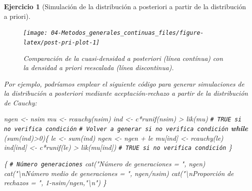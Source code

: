 \documentclass[
]{book}
\newenvironment{Shaded}{\begin{snugshade}}{\end{snugshade}}
\newcommand{\CommentTok}[1]{\textcolor[rgb]{0.56,0.35,0.01}{\textit{#1}}}
\newcommand{\ControlFlowTok}[1]{\textcolor[rgb]{0.13,0.29,0.53}{\textbf{#1}}}
\newcommand{\DecValTok}[1]{\textcolor[rgb]{0.00,0.00,0.81}{#1}}
\newcommand{\FunctionTok}[1]{\textcolor[rgb]{0.00,0.00,0.00}{#1}}
\newcommand{\NormalTok}[1]{#1}
\newcommand{\OtherTok}[1]{\textcolor[rgb]{0.56,0.35,0.01}{#1}}
\newcommand{\SpecialCharTok}[1]{\textcolor[rgb]{0.00,0.00,0.00}{#1}}
\newcommand{\StringTok}[1]{\textcolor[rgb]{0.31,0.60,0.02}{#1}}
\theoremstyle{break}
\newtheorem{exercise}{Ejercicio}[chapter]
\theoremstyle{nonumberplain}
\renewcommand{\CommentTok}[1]{\textcolor[rgb]{0.41,0.41,0.41}{\texttt{#1}}}
\begin{document}
\begin{exercise}[Simulación de la distribución a posteriori a partir de la distribución a priori]
\begin{enumerate}
  \begin{figure}[!htb]

  {\centering \texttt{[image: 04-Metodos\_generales\_continuas\_files/figure-latex/post-pri-plot-1]} 

  }

  \caption{Comparación de la cuasi-densidad a posteriori (línea contínua) con la densidad a priori reescalada (línea discontinua).}\label{fig:post-pri-plot}
  \end{figure}

  Por ejemplo, podríamos emplear el siguiente código para generar simulaciones de la distribución a posteriori mediante aceptación-rechazo a partir de la distribución de Cauchy:

\begin{Shaded}
\begin{Highlighting}[]
\NormalTok{ngen }\OtherTok{\textless{}{-}}\NormalTok{ nsim}
\NormalTok{mu }\OtherTok{\textless{}{-}} \FunctionTok{rcauchy}\NormalTok{(nsim)}
\NormalTok{ind }\OtherTok{\textless{}{-}}\NormalTok{ c}\SpecialCharTok{*}\FunctionTok{runif}\NormalTok{(nsim) }\SpecialCharTok{\textgreater{}} \FunctionTok{lik}\NormalTok{(mu) }\CommentTok{\# TRUE si no verifica condición}
\CommentTok{\# Volver a generar si no verifica condición}
\ControlFlowTok{while}\NormalTok{ (}\FunctionTok{sum}\NormalTok{(ind)}\SpecialCharTok{\textgreater{}}\DecValTok{0}\NormalTok{)\{}
\NormalTok{  le }\OtherTok{\textless{}{-}} \FunctionTok{sum}\NormalTok{(ind)}
\NormalTok{  ngen }\OtherTok{\textless{}{-}}\NormalTok{ ngen }\SpecialCharTok{+}\NormalTok{ le}
\NormalTok{  mu[ind] }\OtherTok{\textless{}{-}} \FunctionTok{rcauchy}\NormalTok{(le)}
\NormalTok{  ind[ind] }\OtherTok{\textless{}{-}}\NormalTok{ c}\SpecialCharTok{*}\FunctionTok{runif}\NormalTok{(le) }\SpecialCharTok{\textgreater{}} \FunctionTok{lik}\NormalTok{(mu[ind]) }\CommentTok{\# TRUE si no verifica condición}
\NormalTok{\}}

\NormalTok{\{ }\CommentTok{\# Número generaciones}
  \FunctionTok{cat}\NormalTok{(}\StringTok{"Número de generaciones = "}\NormalTok{, ngen)}
  \FunctionTok{cat}\NormalTok{(}\StringTok{"}\SpecialCharTok{\textbackslash{}n}\StringTok{Número medio de generaciones = "}\NormalTok{, ngen}\SpecialCharTok{/}\NormalTok{nsim)}
  \FunctionTok{cat}\NormalTok{(}\StringTok{"}\SpecialCharTok{\textbackslash{}n}\StringTok{Proporción de rechazos = "}\NormalTok{, }\DecValTok{1}\SpecialCharTok{{-}}\NormalTok{nsim}\SpecialCharTok{/}\NormalTok{ngen,}\StringTok{"}\SpecialCharTok{\textbackslash{}n}\StringTok{"}\NormalTok{)}
\NormalTok{\}}
\end{Highlighting}
\end{Shaded}


\end{enumerate}
\end{exercise}
\end{document}

